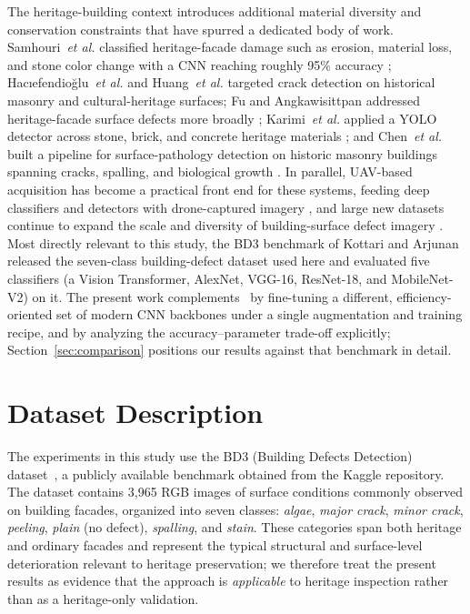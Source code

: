 \documentclass[conference]{IEEEtran}
\begin{document}
The heritage-building context introduces additional material diversity and conservation constraints that have spurred a dedicated body of work. Samhouri~\textit{et al.} classified heritage-facade damage such as erosion, material loss, and stone color change with a CNN reaching roughly 95\% accuracy \cite{ref30}; Hacıefendioğlu~\textit{et al.} \cite{ref31} and Huang~\textit{et al.} \cite{ref34} targeted crack detection on historical masonry and cultural-heritage surfaces; Fu and Angkawisittpan addressed heritage-facade surface defects more broadly \cite{ref32}; Karimi~\textit{et al.} applied a YOLO detector across stone, brick, and concrete heritage materials \cite{ref33}; and Chen~\textit{et al.} built a pipeline for surface-pathology detection on historic masonry buildings spanning cracks, spalling, and biological growth \cite{ref35}. In parallel, UAV-based acquisition has become a practical front end for these systems, feeding deep classifiers and detectors with drone-captured imagery \cite{ref36,ref37,ref38}, and large new datasets continue to expand the scale and diversity of building-surface defect imagery \cite{ref39}. Most directly relevant to this study, the BD3 benchmark of Kottari and Arjunan~\cite{ref40} released the seven-class building-defect dataset used here and evaluated five classifiers (a Vision Transformer, AlexNet, VGG-16, ResNet-18, and MobileNet-V2) on it. The present work complements~\cite{ref40} by fine-tuning a different, efficiency-oriented set of modern CNN backbones under a single augmentation and training recipe, and by analyzing the accuracy--parameter trade-off explicitly; Section~\ref{sec:comparison} positions our results against that benchmark in detail.

\section{Dataset Description}
The experiments in this study use the BD3 (Building Defects Detection) dataset~\cite{ref40}, a publicly available benchmark obtained from the Kaggle repository. The dataset contains 3{,}965 RGB images of surface conditions commonly observed on building facades, organized into seven classes: \textit{algae}, \textit{major crack}, \textit{minor crack}, \textit{peeling}, \textit{plain} (no defect), \textit{spalling}, and \textit{stain}. These categories span both heritage and ordinary facades and represent the typical structural and surface-level deterioration relevant to heritage preservation; we therefore treat the present results as evidence that the approach is \emph{applicable} to heritage inspection rather than as a heritage-only validation.
\end{document}
